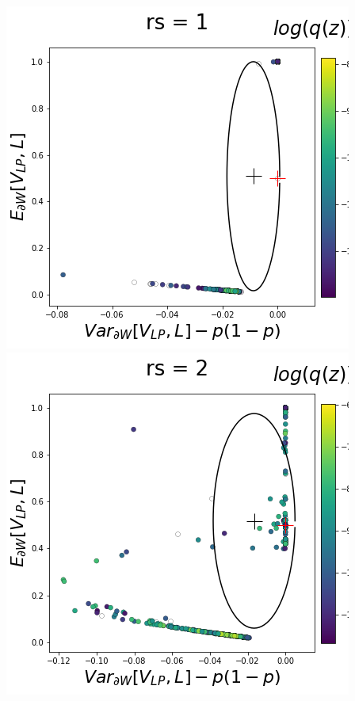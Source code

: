 \documentclass[11pt]{article}
\begin{document}
\begin{center}
\includegraphics[scale=0.33]{figs/T_x_SC_reduced_c=15_p=50_rs=1.png}
\includegraphics[scale=0.33]{figs/T_x_SC_reduced_c=15_p=50_rs=2.png}

\end{center}
\end{document}
